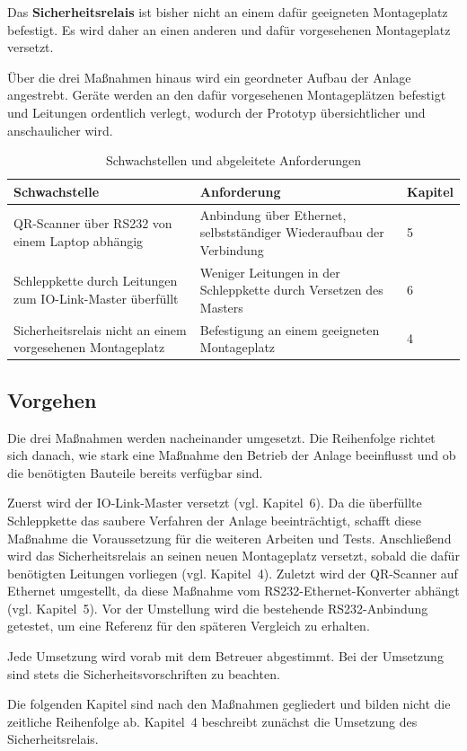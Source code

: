 Das \textbf{Sicherheitsrelais} ist bisher nicht an einem dafür geeigneten Montageplatz befestigt. Es wird daher an einen anderen und dafür vorgesehenen Montageplatz versetzt.

Über die drei Maßnahmen hinaus wird ein geordneter Aufbau der Anlage angestrebt. Geräte werden an den dafür vorgesehenen Montageplätzen befestigt und Leitungen ordentlich verlegt, wodurch der Prototyp übersichtlicher und anschaulicher wird.

\begin{table}[H]
  \centering
  \caption{Schwachstellen und abgeleitete Anforderungen}
  \label{tab:schwachstellen}
  \begin{tabular}{|p{5.4cm}|p{6.4cm}|l|}
    \hline
    \textbf{Schwachstelle} & \textbf{Anforderung} & \textbf{Kapitel} \\ \hline
    QR-Scanner über RS232 von einem Laptop abhängig & Anbindung über Ethernet, selbstständiger Wiederaufbau der Verbindung & 5 \\ \hline
    Schleppkette durch Leitungen zum IO-Link-Master überfüllt & Weniger Leitungen in der Schleppkette durch Versetzen des Masters & 6 \\ \hline
    Sicherheitsrelais nicht an einem vorgesehenen Montageplatz & Befestigung an einem geeigneten Montageplatz & 4 \\ \hline
  \end{tabular}
\end{table}

\subsection{Vorgehen}
Die drei Maßnahmen werden nacheinander umgesetzt. Die Reihenfolge richtet sich danach, wie stark eine Maßnahme den Betrieb der Anlage beeinflusst und ob die benötigten Bauteile bereits verfügbar sind.

Zuerst wird der IO-Link-Master versetzt (vgl. Kapitel~6). Da die überfüllte Schleppkette das saubere Verfahren der Anlage beeinträchtigt, schafft diese Maßnahme die Voraussetzung für die weiteren Arbeiten und Tests. Anschließend wird das Sicherheitsrelais an seinen neuen Montageplatz versetzt, sobald die dafür benötigten Leitungen vorliegen (vgl. Kapitel~4). Zuletzt wird der QR-Scanner auf Ethernet umgestellt, da diese Maßnahme vom RS232-Ethernet-Konverter abhängt (vgl. Kapitel~5). Vor der Umstellung wird die bestehende RS232-Anbindung getestet, um eine Referenz für den späteren Vergleich zu erhalten.

Jede Umsetzung wird vorab mit dem Betreuer abgestimmt. Bei der Umsetzung sind stets die Sicherheitsvorschriften zu beachten.

Die folgenden Kapitel sind nach den Maßnahmen gegliedert und bilden nicht die zeitliche Reihenfolge ab. Kapitel~4 beschreibt zunächst die Umsetzung des Sicherheitsrelais.

